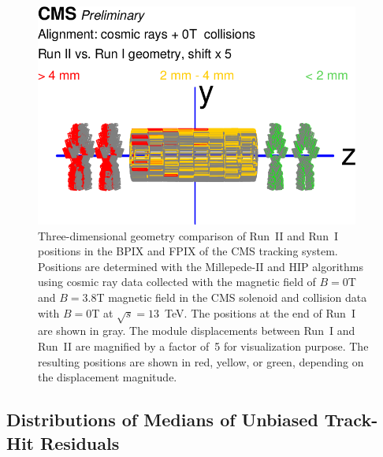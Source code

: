 \begin{figure}[htb]
    \begin{center}
        \includegraphics[width=0.95\textwidth]{../figs/Alignment/AlRes_RunIIvsRunI.png}
    \end{center}
    \caption{Three-dimensional geometry comparison of Run~II and Run~I positions in the BPIX and FPIX of the CMS tracking system. Positions are determined with the Millepede-II and HIP algorithms using cosmic ray data collected with the magnetic field of $B=0$T and $B=3.8$T magnetic field in the CMS solenoid and collision data with $B=0$T at $\sqrt{s}=13$~TeV. The positions at the end of Run~I are shown in gray. The module displacements between Run~I and Run~II are magnified by a factor of~5 for visualization purpose. The resulting positions are shown in red, yellow, or green, depending on the displacement magnitude. }
    \label{fig:GCP_3D}
\end{figure}

\subsection{Distributions of Medians of Unbiased Track-Hit Residuals}
\label{sec:AlRes_DMRs}

